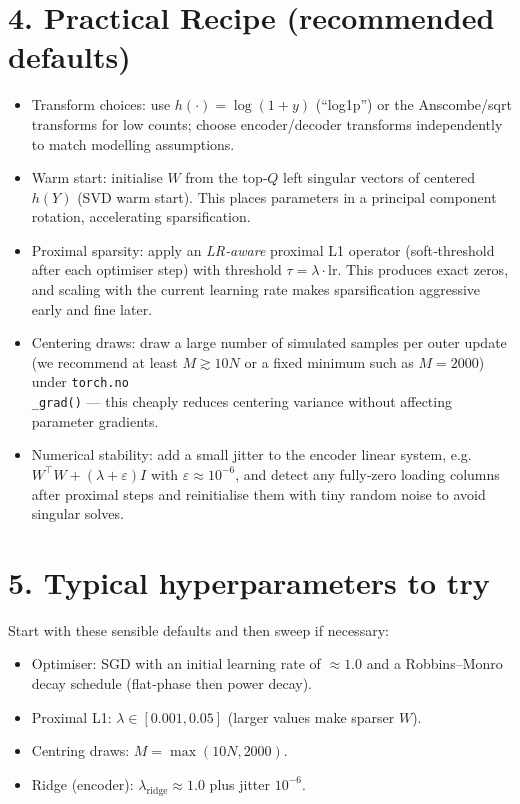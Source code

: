 \documentclass[11pt]{article}
\begin{document}
\section*{4. Practical Recipe (recommended defaults)}
\begin{itemize}
  \item Transform choices: use $h(\cdot)=\log(1+y)$ (``log1p'') or the
    Anscombe/sqrt transforms for low counts; choose encoder/decoder transforms
    independently to match modelling assumptions.
  \item Warm start: initialise $W$ from the top‑$Q$ left singular vectors of
    centered $h(Y)$ (SVD warm start). This places parameters in a principal
    component rotation, accelerating sparsification.
  \item Proximal sparsity: apply an \emph{LR‑aware} proximal L1 operator
    (soft‑threshold after each optimiser step) with threshold $\tau = \lambda\cdot\mathrm{lr}$.
    This produces exact zeros, and scaling with the current learning rate makes
    sparsification aggressive early and fine later.
  \item Centering draws: draw a large number of simulated samples per outer
    update (we recommend at least $M\gtrsim 10N$ or a fixed minimum such as
    $M=2000$) under \texttt{torch.no\\_grad()} — this cheaply reduces centering
    variance without affecting parameter gradients.
  \item Numerical stability: add a small jitter to the encoder linear system,
    e.g. $W^{\top}W + (\lambda+\varepsilon) I$ with $\varepsilon\approx 10^{-6}$,
    and detect any fully‑zero loading columns after proximal steps and
    reinitialise them with tiny random noise to avoid singular solves.
\end{itemize}

\section*{5. Typical hyperparameters to try}
Start with these sensible defaults and then sweep if necessary:
\begin{itemize}
  \item Optimiser: SGD with an initial learning rate of $\approx 1.0$ and a
    Robbins–Monro decay schedule (flat‑phase then power decay).
  \item Proximal L1: $\lambda\in[0.001, 0.05]$ (larger values make sparser $W$).
  \item Centring draws: $M = \max(10N, 2000)$.
  \item Ridge (encoder): $\lambda_{\mathrm{ridge}}\approx 1.0$ plus jitter $10^{-6}$.
\end{itemize}
\end{document}
